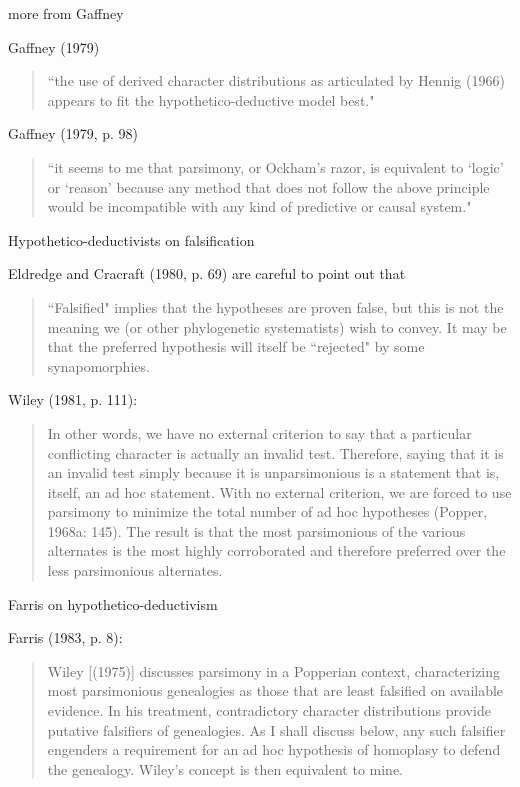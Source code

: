 \documentclass[bluish,slideColor,colorBG,pdf]{prosper}
\begin{document}
\begin{slide}[Replace]{more from Gaffney}

Gaffney (1979)
\begin{quote}
``the use of derived character distributions as articulated by
Hennig (1966) appears to fit the hypothetico-deductive model best."
\end{quote}

Gaffney (1979, p. 98)

\begin{quote}
``it seems to me that
parsimony, or Ockham's razor, is equivalent to `logic' or `reason' because
any method that does not follow the above principle would be incompatible
with any kind of predictive or causal system."
\end{quote}

\end{slide}

\begin{slide}[Replace]{Hypothetico-deductivists on falsification}

Eldredge and Cracraft (1980, p. 69) are careful to point out that

\begin{quote}
``Falsified" implies that
the hypotheses are proven false, but this is not the meaning we (or other
phylogenetic systematists) wish to convey.  It may be that the preferred
hypothesis will itself be ``rejected" by some synapomorphies.
\end{quote}

Wiley (1981, p. 111):

\begin{quote}
In other words, we have no external criterion to say that a particular
conflicting character is actually an invalid test.  Therefore, saying that
it is an invalid test
simply because it is unparsimonious is a statement that is, itself, an
ad hoc statement.  With no external criterion, we are forced to use parsimony
to minimize the total number of ad hoc hypotheses (Popper, 1968a: 145).
The result is that the most parsimonious of the various alternates is the
most highly corroborated and therefore preferred over the less parsimonious
alternates.
\end{quote}

\end{slide}

\begin{slide}[Replace]{Farris on hypothetico-deductivism}

Farris (1983, p. 8):

\begin{quote}
Wiley [(1975)] discusses parsimony in a Popperian context, characterizing
most parsimonious genealogies as those that are least falsified on available
evidence.  In his treatment, contradictory character distributions provide
putative falsifiers of  genealogies.  As I shall discuss below, any such
falsifier engenders a requirement for an ad hoc hypothesis of homoplasy
to defend the genealogy.  Wiley's concept is then equivalent to mine.
\end{quote}

\end{slide}
\end{document}
